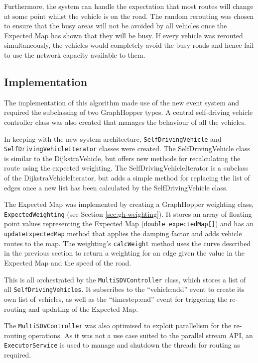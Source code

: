 \documentclass[ %
                    author={Alexander Hill},
                supervisor={Dr. Benjamin Sach},
                    degree={MEng},
                     title={MARMOSET},
                  subtitle={Multi-Agent Route Management using Online Simulation for Efficient Transportation},
                      type={research},
                      year={2016} ]{dissertation}
\begin{document}
Furthermore, the system can handle the expectation that most routes will
change at some point whilst the vehicle is on the road. The random rerouting was
chosen to ensure that the busy areas will not be avoided by all vehicles once the
Expected Map has shown that they will be busy. If every vehicle was rerouted
simultaneously, the vehicles would completely avoid the busy roads and hence
fail to use the network capacity available to them.

\subsection{Implementation}\label{sec:marmoset-impl}

The implementation of this algorithm made use of the new event system and
required the subclassing of two GraphHopper types. A central self-driving vehicle
controller class was also created that manages the behaviour of all the
vehicles.

In keeping with the new system architecture, \texttt{SelfDrivingVehicle} and
\texttt{SelfDrivingVehicleIterator} classes were created. The SelfDrivingVehicle
class is similar to the DijkstraVehicle, but offers new methods for
recalculating the route using the expected weighting. The
SelfDrivingVehicleIterator is a subclass of the DijkstraVehicleIterator, but
adds a simple method for replacing the list of edges once a new list has been
calculated by the SelfDrivingVehicle class.

The Expected Map was implemented by creating a GraphHopper weighting class,
\texttt{ExpectedWeighting} (see Section \ref{sec:gh-weighting}). It stores an
array of floating point values representing the Expected Map (\texttt{double
expectedMap[]}) and has an \texttt{updateExpectedMap} method that applies the
damping factor and adds vehicle routes to the map. The weighting's
\texttt{calcWeight} method uses the curve described in the previous section to
return a weighting for an edge given the value in the Expected Map and the speed
of the road.

This is all orchestrated by the \texttt{MultiSDVController} class, which stores
a list of all \texttt{SelfDrivingVehicles}. It subscribes to the ``vehicle:add'' event
to create its own list of vehicles, as well as the ``timestep:end'' event for
triggering the re-routing and updating of the Expected Map.

The \texttt{MultiSDVController} was also optimised to exploit parallelism for the
re-routing operations. As it was not a use case suited to the parallel stream
API, an \texttt{ExecutorService} is used to manage and shutdown the threads for
routing as required.
\end{document}

